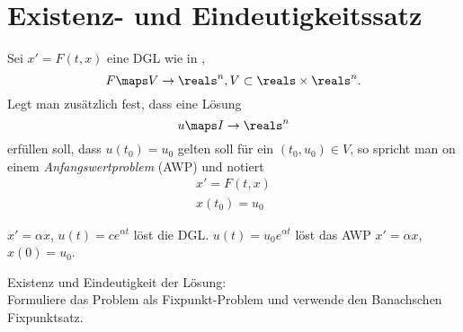 \section*{Existenz- und Eindeutigkeitssatz}
Sei \( x'=F(t,x) \) eine DGL wie in ,
\begin{equation*}
  F\maps V\to \reals^n, V\subset \reals\times \reals^n.
\end{equation*}
Legt man zusätzlich fest, dass eine Lösung
\begin{equation*}
  u\maps I\to \reals^n
\end{equation*}
erfüllen soll, dass \( u(t_0)=u_0 \) gelten soll für ein \( (t_0,u_0)\in V \), so spricht man on einem \emph{Anfangswertproblem} (AWP) und notiert
\begin{equation*}
  \begin{gathered}
    x'=F(t,x)\\
    x(t_0)=u_0
  \end{gathered}\tag{\(*\)}\label{eq:awp}
\end{equation*}
\begin{beispiel*}
  \( x'=\alpha x \), \( u(t)=c e^{\alpha t} \) löst die DGL\@. \( u(t)=u_0 e^{\alpha t} \) löst das AWP \( x'=\alpha x \), \( x(0)=u_0 \).
\end{beispiel*}
Existenz und Eindeutigkeit der Lösung: \\
Formuliere das Problem als Fixpunkt-Problem und verwende den Banachschen Fixpunktsatz.


